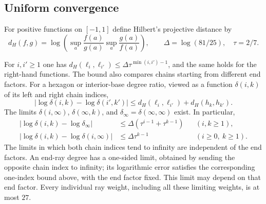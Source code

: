 \subsection{Uniform convergence}
For positive functions on $[-1,1]$ define Hilbert's projective distance by
\[
 d_H(f,g)=\log\left(\sup_a\frac{f(a)}{g(a)}\sup_a\frac{g(a)}{f(a)}\right),
 \qquad \Delta=\log(81/25),\quad \tau=2/7.
\]

\begin{lemma}\label{path:contraction}
For $i,i'\ge1$ one has
$d_H(\ell_i,\ell_{i'})\le\Delta\tau^{\min(i,i')-1}$, and the same holds for
the right-hand functions. The bound also compares chains starting from
different end factors. For a hexagon or interior-base degree ratio, viewed
as a function $\delta(i,k)$ of its left and right chain indices,
\[
 |\log\delta(i,k)-\log\delta(i',k')|
 \le d_H(\ell_i,\ell_{i'})+d_H(h_k,h_{k'}).
\]
The limits $\delta(i,\infty)$, $\delta(\infty,k)$, and
$\delta_\infty=\delta(\infty,\infty)$ exist. In particular,
\begin{align*}
 |\log\delta(i,k)-\log\delta_\infty|
   &\le\Delta(\tau^{i-1}+\tau^{k-1}) &&(i,k\ge1),\\
 |\log\delta(i,k)-\log\delta(i,\infty)|
   &\le\Delta\tau^{k-1} &&(i\ge0,\ k\ge1).
\end{align*}
The limits in which both chain indices tend to infinity are independent
of the end factors.
An end-ray degree has a one-sided limit, obtained by sending the opposite chain index to
infinity; its logarithmic error satisfies the corresponding one-index
bound above, with the end factor fixed. This limit may depend on that end
factor. Every individual ray weight, including all these limiting
weights, is at most $27$.
\end{lemma}

